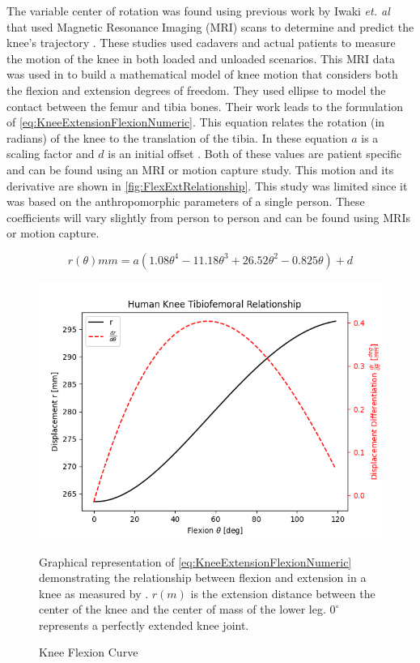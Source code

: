 The variable center of rotation was found using previous work by Iwaki \textit{et. al} that used Magnetic Resonance Imaging (MRI) scans to determine and predict the knee's trajectory \cite{MRIKneeShape_Loaded, MRIKneeShape_Unloaded}. These studies used cadavers and actual patients to measure the motion of the knee in both loaded and unloaded scenarios. This MRI data was used in \cite{KinDynKneeJoint} to build a mathematical model of knee motion that considers both the flexion and extension degrees of freedom. They used ellipse to model the contact between the femur and tibia bones. Their work leads to the formulation of \autoref{eq:KneeExtensionFlexionNumeric}. This equation relates the rotation (in radians) of the knee to the translation of the tibia. In these equation $a$ is a scaling factor and $d$ is an initial offset \cite{wang2013adaptive}. Both of these values are patient specific and can be found using an MRI or motion capture study.  This motion and its derivative are shown in \autoref{fig:FlexExtRelationship}. This study was limited since it was based on the anthropomorphic parameters of a single person. These coefficients will vary slightly from person to person and can be found using MRIs or motion capture. 


\begin{equation}
    r(\theta) mm = a(1.08\theta^4 - 11.18\theta^3 + 26.52\theta^2 - 0.825\theta) + d
    \label{eq:KneeExtensionFlexionNumeric}
\end{equation}

\begin{figure}[ht!]
    \centering
    \includegraphics[scale=0.9]{images/mech_design/FlexionCurve.png}
    \caption{Knee Flexion Curve}{Graphical representation of \autoref{eq:KneeExtensionFlexionNumeric} demonstrating the relationship between flexion and extension in a knee as measured by \cite{KinDynKneeJoint}. \(r(m)\) is the extension distance between the center of the knee and the center of mass of the lower leg. $0^\circ$ represents a perfectly extended knee joint.}
    \label{fig:FlexExtRelationship}
\end{figure} 

